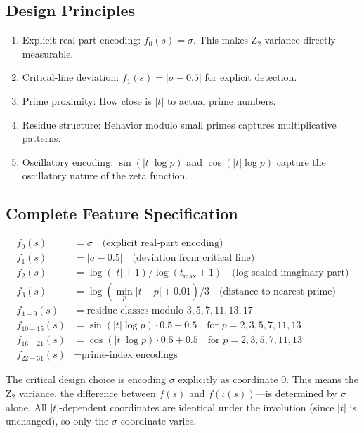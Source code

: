 \documentclass[11pt]{article}
\begin{document}
\subsection{Design Principles}

\begin{enumerate}[nosep]
\item Explicit real-part encoding: $f_0(s) = \sigma$. This makes Z$_2$ variance directly measurable.
\item Critical-line deviation: $f_1(s) = |\sigma - 0.5|$ for explicit detection.
\item Prime proximity: How close is $|t|$ to actual prime numbers.
\item Residue structure: Behavior modulo small primes captures multiplicative patterns.
\item Oscillatory encoding: $\sin(|t|\log p)$ and $\cos(|t|\log p)$ capture the oscillatory nature of the zeta function.
\end{enumerate}

\subsection{Complete Feature Specification}

\begin{align*}
f_0(s) &= \sigma \quad \text{(explicit real-part encoding)} \\
f_1(s) &= |\sigma - 0.5| \quad \text{(deviation from critical line)} \\
f_2(s) &= \log(|t|+1) / \log(t_{\max}+1) \quad \text{(log-scaled imaginary part)} \\
f_3(s) &= \log(\min_p |t-p| + 0.01) / 3 \quad \text{(distance to nearest prime)} \\
f_{4-9}(s) &= \text{residue classes modulo } 3,5,7,11,13,17 \\
f_{10-15}(s) &= \sin(|t| \log p) \cdot 0.5 + 0.5 \quad \text{for } p = 2,3,5,7,11,13 \\
f_{16-21}(s) &= \cos(|t| \log p) \cdot 0.5 + 0.5 \quad \text{for } p = 2,3,5,7,11,13 \\
f_{22-31}(s) &= \text{prime-index encodings}
\end{align*}

The critical design choice is encoding $\sigma$ explicitly as coordinate 0. This means the Z$_2$ variance, the difference between $f(s)$ and $f(\iota(s))$---is determined by $\sigma$ alone. All $|t|$-dependent coordinates are identical under the involution (since $|t|$ is unchanged), so only the $\sigma$-coordinate varies.
\end{document}
